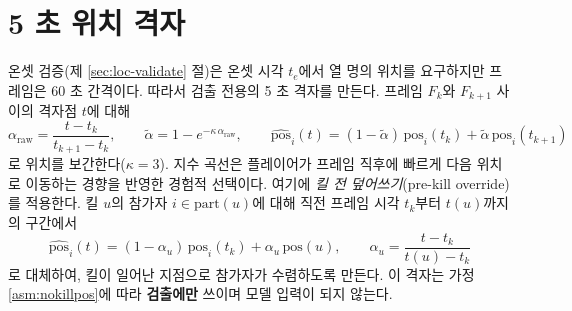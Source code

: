 
\section{5 초 위치 격자}
\label{sec:loc-grid}

온셋 검증(제 \ref{sec:loc-validate} 절)은 온셋 시각 $t_e$에서 열 명의 위치를 요구하지만 프레임은 60 초 간격이다. 따라서 검출 전용의 5 초 격자를 만든다. 프레임 $F_k$와 $F_{k+1}$ 사이의 격자점 $t$에 대해
\begin{equation}
  \alpha_{\mathrm{raw}} = \frac{t - t_k}{t_{k+1} - t_k}, \qquad
  \tilde{\alpha} = 1 - e^{-\kappa\,\alpha_{\mathrm{raw}}}, \qquad
  \widehat{\mathrm{pos}}_i(t) = (1-\tilde\alpha)\,\mathrm{pos}_i(t_k) + \tilde\alpha\,\mathrm{pos}_i(t_{k+1})
  \label{eq:interp}
\end{equation}
로 위치를 보간한다($\kappa = 3$). 지수 곡선은 플레이어가 프레임 직후에 빠르게 다음 위치로 이동하는 경향을 반영한 경험적 선택이다. 여기에 \emph{킬 전 덮어쓰기}(pre-kill override)를 적용한다. 킬 $u$의 참가자 $i \in \mathrm{part}(u)$에 대해 직전 프레임 시각 $t_k$부터 $t(u)$까지의 구간에서
\begin{equation}
  \widehat{\mathrm{pos}}_i(t) = (1-\alpha_u)\,\mathrm{pos}_i(t_k) + \alpha_u\,\mathrm{pos}(u), \qquad \alpha_u = \frac{t - t_k}{t(u) - t_k}
\end{equation}
로 대체하여, 킬이 일어난 지점으로 참가자가 수렴하도록 만든다. 이 격자는 가정 \ref{asm:nokillpos}에 따라 \textbf{검출에만} 쓰이며 모델 입력이 되지 않는다.
